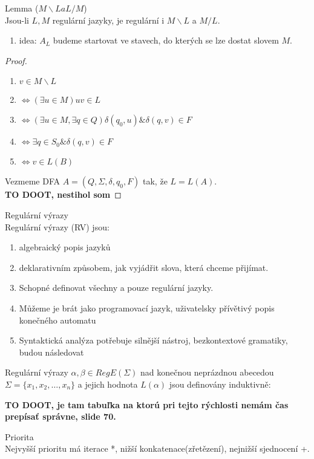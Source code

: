 \documentclass[../main.tex]{subfiles}
\begin{document}
\begin{theorem}
    Lemma ($M \backslash L a L/M$)\\

    Jsou-li $L,M$ regulární jazyky, je regulární i $M\backslash L$ a $M/L$.
    \begin{enumerate}
        \item idea: $A_L$ budeme startovat ve stavech, do kterých se lze dostat slovem $M$.
    \end{enumerate}
    \begin{proof}
        \begin{enumerate}
            \item $v \in M \backslash L$
            \item $\Leftrightarrow (\exists u \in M) uv \in L$
            \item $\Leftrightarrow (\exists u \in M, \exists q \in Q) \delta(q_0,u) \& \delta(q,v) \in F$
            \item $\Leftrightarrow \exists q \in S_0 \& \delta(q,v) \in F$
            \item $\Leftrightarrow v \in L(B)$
        \end{enumerate}
        Vezmeme DFA $A = (Q,\Sigma,\delta,q_0,F)$ tak, že $L = L(A)$.\\
        \textbf{TO DOOT, nestihol som}
    \end{proof}
\end{theorem}


\begin{definition}
    Regulární výrazy\\

    Regulární výrazy (RV) jsou:
    \begin{enumerate}
        \item algebraický popis jazyků
        \item deklarativním způsobem, jak vyjádřit slova, která chceme přijímat.
        \item Schopné definovat všechny a pouze regulární jazyky.
        \item Můžeme je brát jako programovací jazyk, uživatelsky přívětivý popis konečného automatu
        \item Syntaktická analýza potřebuje silnější nástroj, bezkontextové gramatiky, budou následovat
    \end{enumerate}

    Regulární výrazy $\alpha, \beta \in RegE(\Sigma)$ nad konečnou neprázdnou abecedou 
    $\Sigma = \{x_1,x_2,\dots ,x_n\}$ a jejich hodnota $L(\alpha)$ jsou definovány induktivně:
    
    \textbf{TO DOOT, je tam tabuľka na ktorú pri tejto rýchlosti nemám čas prepísať správne, slide 70.}
\end{definition}
\begin{definition}
    Priorita\\

    Nejvyšší prioritu má iterace *, nižší konkatenace(zřetězení), nejnižší sjednocení +.
\end{definition}
\end{document}
